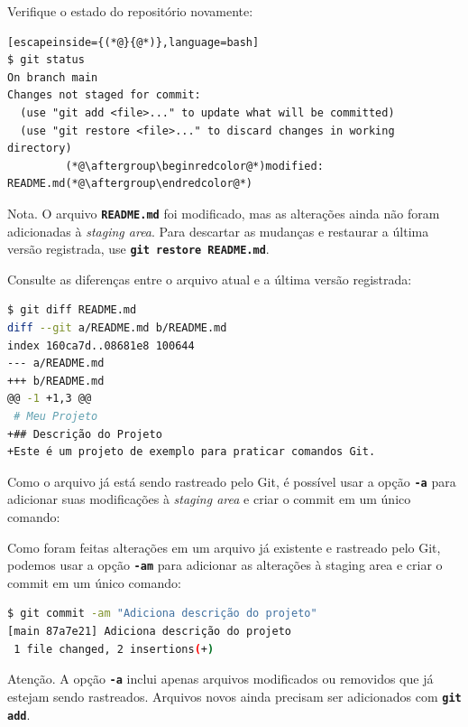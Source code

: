\documentclass[12pt,a4paper]{article}
\begin{document}
Verifique o estado do repositório novamente:

\begin{lstlisting}[escapeinside={(*@}{@*)},language=bash]
$ git status
On branch main
Changes not staged for commit:
  (use "git add <file>..." to update what will be committed)
  (use "git restore <file>..." to discard changes in working directory)
         (*@\aftergroup\beginredcolor@*)modified:   README.md(*@\aftergroup\endredcolor@*)
\end{lstlisting}

\begin{question}{Nota.}
\footnotesize O arquivo \textbf{\texttt{README.md}} foi modificado, mas as alterações ainda não foram adicionadas à \textit{staging area}. Para descartar as mudanças e restaurar a última versão registrada, use \textbf{\texttt{git restore README.md}}.
\end{question}

Consulte as diferenças entre o arquivo atual e a última versão registrada:

\begin{lstlisting}[language=bash]
$ git diff README.md
diff --git a/README.md b/README.md
index 160ca7d..08681e8 100644
--- a/README.md
+++ b/README.md
@@ -1 +1,3 @@
 # Meu Projeto
+## Descrição do Projeto
+Este é um projeto de exemplo para praticar comandos Git.
\end{lstlisting}

Como o arquivo já está sendo rastreado pelo Git, é possível usar a opção \textbf{\texttt{-a}} para adicionar suas modificações à \textit{staging area} e criar o commit em um único comando:

Como foram feitas alterações em um arquivo já existente e rastreado pelo Git,
podemos usar a opção \textbf{\texttt{-am}} para adicionar as alterações à staging
area e criar o commit em um único comando:

\begin{lstlisting}[language=bash]
$ git commit -am "Adiciona descrição do projeto"
[main 87a7e21] Adiciona descrição do projeto
 1 file changed, 2 insertions(+)
\end{lstlisting}

\begin{question}{Atenção.}
\footnotesize A opção \textbf{\texttt{-a}} inclui apenas arquivos modificados ou removidos que já estejam sendo rastreados. Arquivos novos ainda precisam ser adicionados com \textbf{\texttt{git add}}.
\end{question}
\end{document}
